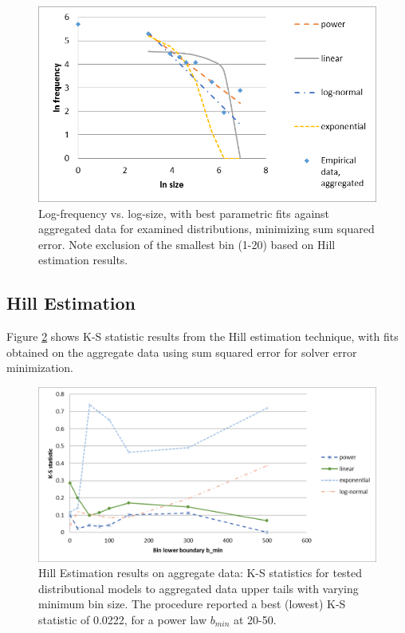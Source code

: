 \documentclass[pdftex,12pt]{llncs}
\begin{document}
\begin{figure}[h]
  \centering
  \includegraphics[width=1.0\textwidth]{bestfits}
  \caption{Log-frequency vs. log-size, with best parametric fits against aggregated data for examined distributions, minimizing sum squared error.  Note exclusion of the smallest bin (1-20) based on Hill estimation results.}
  \label{fig:bestfits}
\end{figure}

\subsection{Hill Estimation}
Figure \ref{fig:hillestimation} shows K-S statistic results from the Hill estimation technique, with fits obtained on the aggregate data using sum squared error for solver error minimization.

\begin{figure}[h]
  \centering
  \includegraphics[width=1.0\textwidth]{hillestimation}
  \caption{Hill Estimation results on aggregate data: K-S statistics for tested distributional models to aggregated data upper tails with varying minimum bin size. The procedure reported a best (lowest) K-S statistic of 0.0222, for a power law $b_{min}$ at 20-50.}
  \label{fig:hillestimation}
\end{figure}
\end{document}

